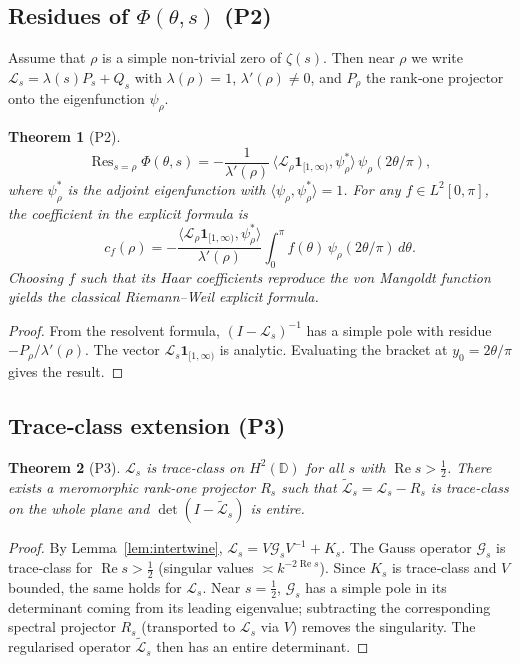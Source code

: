 \documentclass[11pt,a4paper]{article}
\newtheorem{theorem}{Theorem}[section]
\theoremstyle{remark}
\newcommand{\cL}{\mathcal{L}}
\newcommand{\cG}{\mathcal{G}}
\DeclareMathOperator{\Res}{Res}
\begin{document}
\subsection{Residues of $\Phi(\theta,s)$ (P2)}
Assume that $\rho$ is a simple non‑trivial zero of $\zeta(s)$. Then near $\rho$ we write $\cL_s=\lambda(s)P_s+Q_s$ with $\lambda(\rho)=1$, $\lambda'(\rho)\neq0$, and $P_\rho$ the rank‑one projector onto the eigenfunction $\psi_\rho$.
\begin{theorem}[P2]\label{thm:residues}
\[
\Res_{s=\rho}\Phi(\theta,s)=-\frac{1}{\lambda'(\rho)}\,\langle\cL_\rho\mathbf{1}_{[1,\infty)},\psi_\rho^*\rangle\,\psi_\rho(2\theta/\pi),
\]
where $\psi_\rho^*$ is the adjoint eigenfunction with $\langle\psi_\rho,\psi_\rho^*\rangle=1$.
For any $f\in L^2[0,\pi]$, the coefficient in the explicit formula is
\[
c_f(\rho)=-\frac{\langle\cL_\rho\mathbf{1}_{[1,\infty)},\psi_\rho^*\rangle}{\lambda'(\rho)}\int_0^\pi f(\theta)\,\psi_\rho(2\theta/\pi)\,d\theta.
\]
Choosing $f$ such that its Haar coefficients reproduce the von Mangoldt function yields the classical Riemann–Weil explicit formula.
\end{theorem}
\begin{proof}
From the resolvent formula, $(I-\cL_s)^{-1}$ has a simple pole with residue $-P_\rho/\lambda'(\rho)$. The vector $\cL_s\mathbf{1}_{[1,\infty)}$ is analytic. Evaluating the bracket at $y_0=2\theta/\pi$ gives the result.
\end{proof}

\subsection{Trace‑class extension (P3)}
\begin{theorem}[P3]\label{thm:trace}
$\cL_s$ is trace‑class on $H^2(\mathbb{D})$ for all $s$ with $\operatorname{Re}s>\tfrac12$. There exists a meromorphic rank‑one projector $R_s$ such that $\widetilde{\cL}_s=\cL_s-R_s$ is trace‑class on the whole plane and $\det(I-\widetilde{\cL}_s)$ is entire.
\end{theorem}
\begin{proof}
By Lemma~\ref{lem:intertwine}, $\cL_s=V\cG_s V^{-1}+K_s$. The Gauss operator $\cG_s$ is trace‑class for $\operatorname{Re}s>\tfrac12$ (singular values $\asymp k^{-2\operatorname{Re}s}$). Since $K_s$ is trace‑class and $V$ bounded, the same holds for $\cL_s$. Near $s=\tfrac12$, $\cG_s$ has a simple pole in its determinant coming from its leading eigenvalue; subtracting the corresponding spectral projector $R_s$ (transported to $\cL_s$ via $V$) removes the singularity. The regularised operator $\widetilde{\cL}_s$ then has an entire determinant.
\end{proof}
\end{document}
